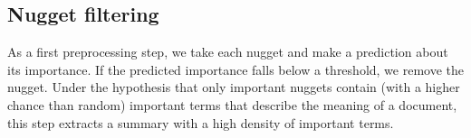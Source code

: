 \documentclass[
  digital, %
  notable, %
  lof,     %
  lot,     %
  nopalatino, color
]{fithesis3}
\begin{document}
%
%
%
% 
% 
% 
% 
% 
% 
\subsection{Nugget filtering}
\label{sec:segmentation-nugget-filtering}
As a first preprocessing step, we take each nugget and make a prediction about
its importance. If the predicted importance falls below a threshold, we remove
the nugget. Under the hypothesis that only important nuggets contain (with a
higher chance than random) important terms that describe the meaning of a
document, this step extracts a summary with a high density of important terms.
\end{document}
